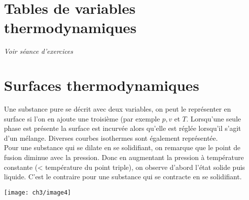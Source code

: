 \section{Tables de variables thermodynamiques}
\textit{Voir séance d'exercices}


\section{Surfaces thermodynamiques}
Une substance pure se décrit avec deux variables, on peut le 
représenter en surface si l'on en ajoute une troisième (par 
exemple $p,v$ et $T$. Lorsqu'une seule phase est présente la 
surface est incurvée alors qu'elle est réglée lorsqu'il s'agit 
d'un mélange. Diverses courbes isothermes sont également 
représentée. \\
Pour une substance qui se dilate en se solidifiant, on remarque que le point de fusion diminue avec la pression. Donc en augmentant la pression à température constante (< température du point triple), on observe d'abord l'état solide puis liquide. C'est le contraire pour une substance qui se contracte en se solidifiant. 

\begin{center}
	\texttt{[image: ch3/image4]}
\end{center}








 



